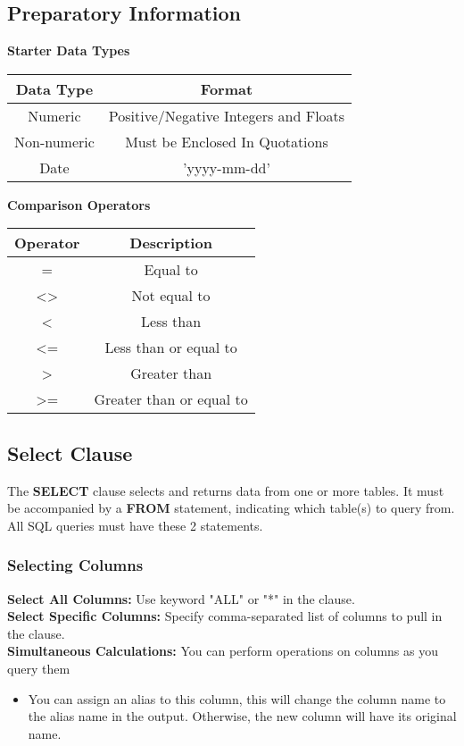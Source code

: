 \subsection{Preparatory Information}
\textbf{Starter Data Types}
\label{sec: data types}
\begin{center}
    \begin{tabular}{c|c}
       Data Type  &  Format\\
       \hline
         Numeric& Positive/Negative Integers and Floats\\
         Non-numeric & Must be Enclosed In Quotations\\
         Date & 'yyyy-mm-dd'\\
    \end{tabular}
\end{center}


\textbf{Comparison Operators}
\begin{center}
    \begin{tabular}{c|c}
        Operator & Description \\
        \hline
        = & Equal to\\
        \textless\textgreater & Not equal to\\
        \textless& Less than\\
        \textless= & Less than or equal to\\
        \textgreater & Greater than\\
        \textgreater= & Greater than or equal to\\
        
    \end{tabular}
\end{center}
\subsection{Select Clause}
The \textcolor{textgray}{\textbf{SELECT}} clause selects and returns data from one or more tables. It must be accompanied by a \textcolor{textgray}{\textbf{FROM}} statement, indicating which table(s) to query from. All SQL queries must have these 2 statements.
\subsubsection{Selecting Columns}
\textbf{Select All Columns:} Use keyword "ALL" or "*" in the clause.\\[0.35cm]
\textbf{Select Specific Columns:} Specify comma-separated list of columns to pull in the clause.\\[0.35cm]
\textbf{Simultaneous Calculations:} You can perform operations on columns as you query them
\begin{itemize}
    \item You can assign an alias to this column, this will change the column name to the alias name in the output. Otherwise, the new column will have its original name.
\end{itemize}

